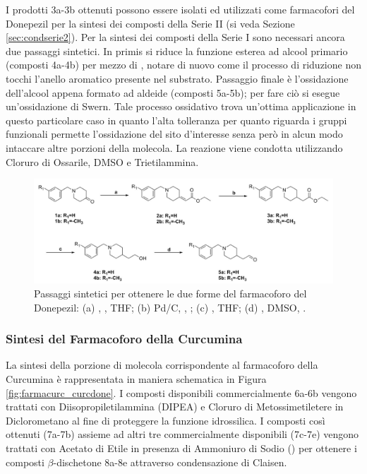 \documentclass[a4paper, 12pt]{article}
\begin{document}
I prodotti 3a-3b ottenuti possono essere isolati ed utilizzati come farmacofori del Donepezil per la sintesi dei composti della Serie II (si veda Sezione \ref{sec:condserie2}). Per la sintesi dei composti della Serie I sono necessari ancora due passaggi sintetici. In primis si riduce la funzione esterea ad alcool primario (composti 4a-4b) per mezzo di , notare di nuovo come il processo di riduzione non tocchi l'anello aromatico presente nel substrato. Passaggio finale è l'ossidazione dell'alcool appena formato ad aldeide (composti 5a-5b); per fare ciò si esegue un'ossidazione di Swern. Tale processo ossidativo trova un'ottima applicazione in questo particolare caso in quanto l'alta tolleranza per quanto riguarda i gruppi funzionali permette l'ossidazione del sito d'interesse senza però in alcun modo intaccare altre porzioni della molecola. La reazione viene condotta utilizzando Cloruro di Ossarile, DMSO e Trietilammina. \cite{bruice_chimica_2012}

\begin{figure}[H]
	\centering
	\includegraphics[width=\linewidth]{immagini/farmadone_curcdone.png}
	\caption{Passaggi sintetici per ottenere le due forme del farmacoforo del Donepezil: (a) ,  , THF; (b) Pd/C,  , ; (c)  , THF; (d) , DMSO, .}
	\label{fig:farmadone_curcdone}
\end{figure}

\subsubsection{Sintesi del Farmacoforo della Curcumina}
\label{sec:sintesicurc}
La sintesi della porzione di molecola corrispondente al farmacoforo della Curcumina è rappresentata in maniera schematica in Figura \ref{fig:farmacurc_curcdone}. I composti disponibili commercialmente 6a-6b vengono trattati con Diisopropiletilammina (DIPEA) e Cloruro di Metossimetiletere in Diclorometano al fine di proteggere la funzione idrossilica. I composti così ottenuti (7a-7b) assieme ad altri tre commercialmente disponibili (7c-7e) vengono trattati con Acetato di Etile in presenza di Ammoniuro di Sodio () per ottenere i composti $\beta$-dischetone 8a-8e attraverso condensazione di Claisen.
\end{document}
